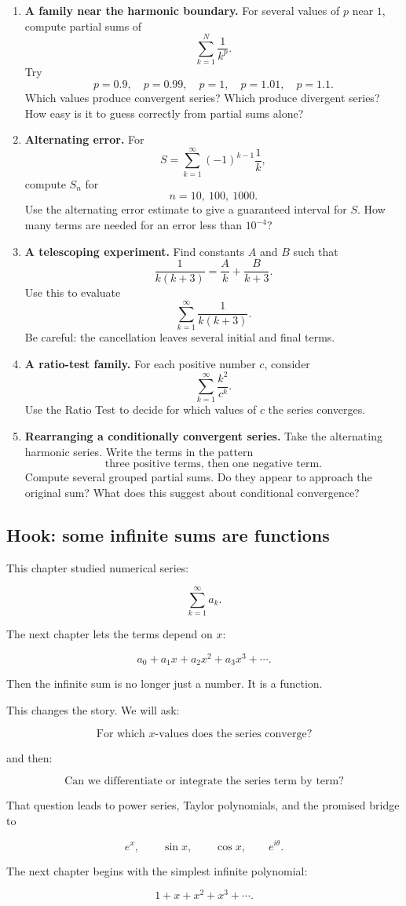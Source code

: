 \begin{enumerate}
\item \textbf{A family near the harmonic boundary.}
For several values of \(p\) near \(1\), compute partial sums of
\[
\sum_{k=1}^{N}\frac1{k^p}.
\]
Try
\[
p=0.9,\quad p=0.99,\quad p=1,\quad p=1.01,\quad p=1.1.
\]
Which values produce convergent series?  Which produce divergent series?  How easy is
it to guess correctly from partial sums alone?

\item \textbf{Alternating error.}
For
\[
S=\sum_{k=1}^{\infty}(-1)^{k-1}\frac1k,
\]
compute \(S_n\) for
\[
n=10,\ 100,\ 1000.
\]
Use the alternating error estimate to give a guaranteed interval for \(S\).  How many
terms are needed for an error less than \(10^{-4}\)?

\item \textbf{A telescoping experiment.}
Find constants \(A\) and \(B\) such that
\[
\frac1{k(k+3)}
=
\frac{A}{k}+\frac{B}{k+3}.
\]
Use this to evaluate
\[
\sum_{k=1}^{\infty}\frac1{k(k+3)}.
\]
Be careful: the cancellation leaves several initial and final terms.

\item \textbf{A ratio-test family.}
For each positive number \(c\), consider
\[
\sum_{k=1}^{\infty}\frac{k^2}{c^k}.
\]
Use the Ratio Test to decide for which values of \(c\) the series converges.

\item \textbf{Rearranging a conditionally convergent series.}
Take the alternating harmonic series.  Write the terms in the pattern
\[
\text{three positive terms, then one negative term}.
\]
Compute several grouped partial sums.  Do they appear to approach the original sum?
What does this suggest about conditional convergence?
\end{enumerate}

\subsection{Hook: some infinite sums are functions}
\label{subsec:hook-infinite-sums-as-functions}

This chapter studied numerical series:

\[
\sum_{k=1}^{\infty}a_k.
\]

The next chapter lets the terms depend on \(x\):

\[
a_0+a_1x+a_2x^2+a_3x^3+\cdots.
\]

Then the infinite sum is no longer just a number.  It is a function.

This changes the story.  We will ask:

\[
\text{For which \(x\)-values does the series converge?}
\]

and then:

\[
\text{Can we differentiate or integrate the series term by term?}
\]

That question leads to power series, Taylor polynomials, and the promised bridge to

\[
e^x,
\qquad
\sin x,
\qquad
\cos x,
\qquad
e^{i\theta}.
\]

The next chapter begins with the simplest infinite polynomial:

\[
1+x+x^2+x^3+\cdots.
\]